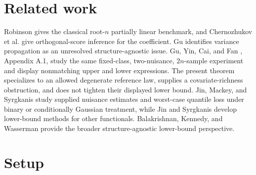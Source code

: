 \documentclass{article}
\begin{document}
\section{Related work}

Robinson \cite{robinson1988root} gives the classical root-\(n\) partially linear benchmark, and Chernozhukov et al. \cite{chernozhukov2018dml} give orthogonal-score inference for the coefficient. Gu \cite{gu2025open} identifies variance propagation as an unresolved structure-agnostic issue. Gu, Yin, Cai, and Fan \cite{gu2026optimally}, Appendix A.1, study the same fixed-class, two-nuisance, \(2n\)-sample experiment and display nonmatching upper and lower expressions. The present theorem specializes to an allowed degenerate reference law, supplies a covariate-richness obstruction, and does not tighten their displayed lower bound. Jin, Mackey, and Syrgkanis \cite{jin2025hardnormal} study supplied nuisance estimates and worst-case quantile loss under binary or conditionally Gaussian treatment, while Jin and Syrgkanis \cite{jin2025sharp} develop lower-bound methods for other functionals. Balakrishnan, Kennedy, and Wasserman \cite{balakrishnan2023fundamental} provide the broader structure-agnostic lower-bound perspective.

\section{Setup}
\end{document}
